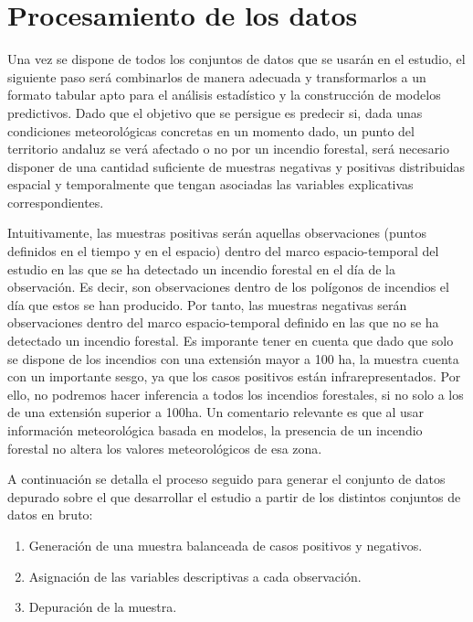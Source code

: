 \documentclass[12pt,a4paper,]{book}
\providecommand{\tightlist}{%
  \setlength{\itemsep}{0pt}\setlength{\parskip}{0pt}}
\numberwithin{dummy}{section}
\theoremstyle{ocrenumbox}
\theoremstyle{blacknumex}
\theoremstyle{blacknumbox}
\theoremstyle{ocrenum}
\theoremstyle{ocrenum}
\begin{document}
\hypertarget{procesamiento-de-los-datos}{%
\section{Procesamiento de los datos}\label{procesamiento-de-los-datos}}

Una vez se dispone de todos los conjuntos de datos que se usarán en el
estudio, el siguiente paso será combinarlos de manera adecuada y
transformarlos a un formato tabular apto para el análisis estadístico y
la construcción de modelos predictivos. Dado que el objetivo que se
persigue es predecir si, dada unas condiciones meteorológicas concretas
en un momento dado, un punto del territorio andaluz se verá afectado o
no por un incendio forestal, será necesario disponer de una cantidad
suficiente de muestras negativas y positivas distribuidas espacial y
temporalmente que tengan asociadas las variables explicativas
correspondientes.

Intuitivamente, las muestras positivas serán aquellas observaciones
(puntos definidos en el tiempo y en el espacio) dentro del marco
espacio-temporal del estudio en las que se ha detectado un incendio
forestal en el día de la observación. Es decir, son observaciones dentro
de los polígonos de incendios el día que estos se han producido. Por
tanto, las muestras negativas serán observaciones dentro del marco
espacio-temporal definido en las que no se ha detectado un incendio
forestal. Es imporante tener en cuenta que dado que solo se dispone de
los incendios con una extensión mayor a 100 ha, la muestra cuenta con un
importante sesgo, ya que los casos positivos están infrarepresentados.
Por ello, no podremos hacer inferencia a todos los incendios forestales,
si no solo a los de una extensión superior a 100ha. Un comentario
relevante es que al usar información meteorológica basada en modelos, la
presencia de un incendio forestal no altera los valores meteorológicos
de esa zona.

A continuación se detalla el proceso seguido para generar el conjunto de
datos depurado sobre el que desarrollar el estudio a partir de los
distintos conjuntos de datos en bruto:

\begin{enumerate}
\def\labelenumi{\arabic{enumi}.}
\tightlist
\item
  Generación de una muestra balanceada de casos positivos y negativos.
\item
  Asignación de las variables descriptivas a cada observación.
\item
  Depuración de la muestra.
\end{enumerate}
\end{document}
